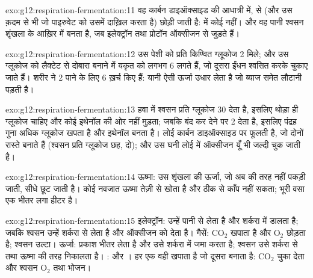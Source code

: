 \begin{solution}{exo:g12:respiration-fermentation:11}
वह कार्बन डाइऑक्साइड  की आधात्री में,  से (और उस
क़दम से भी जो पाइरुवेट को उसमें दाख़िल करता है) छोड़ी जाती है: 
में कोई नहीं। और वह पानी श्वसन शृंखला के आख़िर में बनता है, जब इलेक्ट्रॉन
तथा प्रोटॉन ऑक्सीजन से जुड़ते हैं।
\end{solution}

\begin{solution}{exo:g12:respiration-fermentation:12}
उस पेशी को प्रति किण्वित ग्लूकोज 2  मिले; और उस ग्लूकोज को लैक्टेट से
दोबारा बनाने में यकृत को लगभग 6  लगते हैं, जो दूसरा ईंधन श्वसित करके
चुकाए जाते हैं। शरीर ने 2 पाने के लिए 6 ख़र्च किए हैं: यानी  ऐसी
ऊर्जा उधार लेता है जो ब्याज समेत लौटानी पड़ती है।
\end{solution}

\begin{solution}{exo:g12:respiration-fermentation:13}
हवा में श्वसन प्रति ग्लूकोज 30  देता है, इसलिए थोड़ा ही ग्लूकोज चाहिए और
कोई इथेनॉल की ओर नहीं मुड़ता; जबकि बंद कर देने पर  2 देता है, इसलिए
पंद्रह गुना अधिक ग्लूकोज खपता है और इथेनॉल बनता है। लोई कार्बन डाइऑक्साइड
पर फूलती है, जो दोनों रास्ते बनाते हैं (श्वसन प्रति ग्लूकोज छह,  दो);
और उस घनी लोई में ऑक्सीजन यूँ भी जल्दी चुक जाती है।
\end{solution}

\begin{solution}{exo:g12:respiration-fermentation:14}
ऊष्मा: उस शृंखला की ऊर्जा, जो अब  की तरह नहीं पकड़ी जाती, सीधे छूट जाती
है। कोई नवजात ऊष्मा तेज़ी से खोता है और ठीक से काँप नहीं सकता; भूरी वसा एक
भीतर लगा हीटर है।
\end{solution}

\begin{solution}{exo:g12:respiration-fermentation:15}
इलेक्ट्रॉन:  उन्हें पानी से लेता है और शर्करा में डालता है;
जबकि श्वसन उन्हें शर्करा से लेता है और ऑक्सीजन को देता है। गैसें:
 $\mathrm{CO_2}$ खपाता है और $\mathrm{O_2}$ छोड़ता है; श्वसन
उल्टा। ऊर्जा:  प्रकाश भीतर लेता है और उसे शर्करा में जमा करता
है; श्वसन उसे शर्करा से  तथा ऊष्मा की तरह निकालता है। : 
और । हर एक वही खपाता है जो दूसरा बनाता है: 
$\mathrm{CO_2}$ चुका देता और श्वसन $\mathrm{O_2}$ तथा भोजन।
\end{solution}

